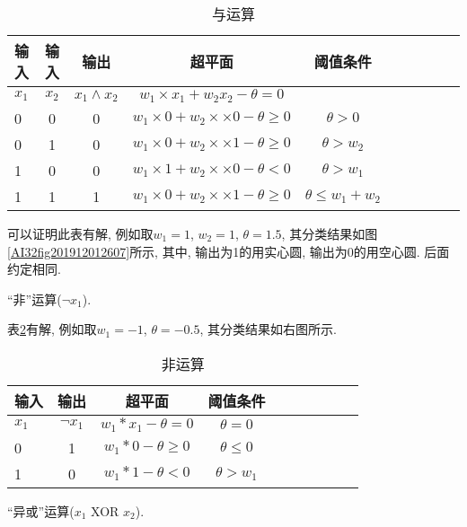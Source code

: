 \begin{table}[H]
\caption{与运算}
\begin{center}
\begin{tabular} {lccccccccc}
  \hline
输入&输入	&输出&超平面&	阈值条件\\
\hline
$x_1$&$x_2$&$x_1\wedge x_2$	&$w_1\times x_1+ w_2 x_2-\theta=0$  &\\
0&	0&	0&$w_1\times 0+ w_2\times\times 0-\theta \geq 0$ 	&$\theta> 0$\\
0&	1&0	&$w_1\times0 + w_2\times\times 1-\theta \geq 0$ 	&$\theta>w_2$\\
1&	0&	0&$w_1\times1+ w_2\times\times 0 -\theta <0$ 	    &$\theta >w_1$\\
1&	1&	1&$w_1\times0 + w_2\times\times 1-\theta \geq 0$ 	&$\theta\leq w_1+w_2$\\
\hline
\end{tabular}
\end{center}
\label{AI_table2019112900011}
\end{table}

可以证明此表有解, 例如取$w_1=1$, $w_2=1$, $\theta=1.5$, 其分类结果如图\ref{AI32fig201912012607}所示,
其中, 输出为1的用实心圆, 输出为0的用空心圆. 后面约定相同.
\begin{example}
  “非”运算($\neg x_1$).
\end{example}

表\ref{AI_table2019112902}有解, 例如取$w_1=-1$, $\theta=-0.5$, 其分类结果如右图所示.
\begin{table}[H]
\caption{非运算}
\begin{center}
\begin{tabular} {lccccccccc}
  \hline
输入&	输出&	超平面&	阈值条件\\
\hline
$x_1$&	$\neg x_1$&	$w_1*x_1-\theta=0$  &$\theta =0$\\
0&	1&	$w_1*0 -\theta \geq 0$ 	&$\theta\leq 0$\\
1&	0&	$w_1*1 -\theta <0$ 	    &$\theta >w_1$\\
\hline
\end{tabular}
\end{center}
\label{AI_table2019112902}
\end{table}

\begin{example}
  “异或”运算($x_1$ XOR $x_2$).
\end{example}

